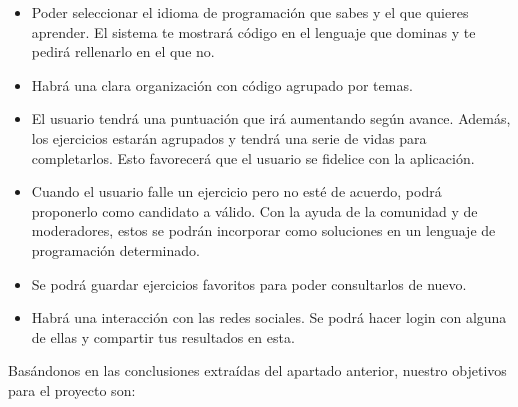 \begin{itemize}
\item
Poder seleccionar el idioma de programación que sabes y el que quieres aprender. El sistema te mostrará código en el lenguaje que dominas y te pedirá rellenarlo en el que no.

\item
Habrá una clara organización con código agrupado por temas.

\item
El usuario tendrá una puntuación que irá aumentando según avance. Además, los ejercicios estarán agrupados y tendrá una serie de vidas para completarlos. Esto favorecerá  que el usuario se fidelice con la aplicación.

\item
Cuando el usuario falle un ejercicio pero no esté de acuerdo, podrá proponerlo como candidato a válido. Con la ayuda de la comunidad y de moderadores, estos se podrán incorporar como soluciones en un lenguaje de programación determinado.

\item
Se podrá guardar ejercicios favoritos para poder consultarlos de nuevo.

\item
Habrá una interacción con las redes sociales. Se podrá hacer login con alguna de ellas y compartir tus resultados en esta.
\end{itemize}

Basándonos en las conclusiones extraídas del apartado anterior, nuestro objetivos para el proyecto son:

